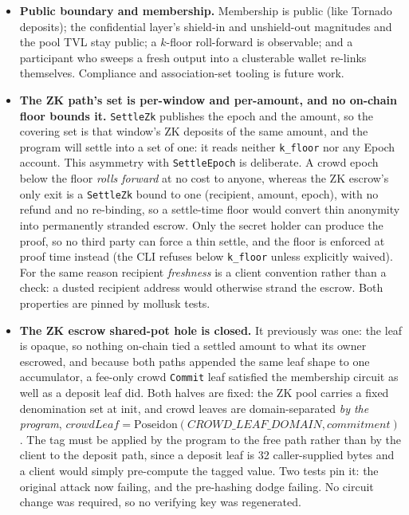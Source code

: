 \documentclass[10pt]{article}
\newcommand{\code}[1]{\texttt{#1}}
\begin{document}
\begin{itemize}[leftmargin=1.4em,itemsep=0.15em]
        path makes a cross-epoch claim, and mitigations are roadmap items.
  \item \textbf{Public boundary and membership.} Membership is public (like
        Tornado deposits); the confidential layer's shield-in and unshield-out
        magnitudes and the pool TVL stay public; a $k$-floor roll-forward is
        observable; and a participant who sweeps a fresh output into a clusterable
        wallet re-links themselves. Compliance and association-set tooling is
        future work.
  \item \textbf{The ZK path's set is per-window and per-amount, and no on-chain
        floor bounds it.} \code{SettleZk} publishes the epoch and the amount, so
        the covering set is that window's ZK deposits of the same amount, and the
        program will settle into a set of one: it reads neither \code{k\_floor}
        nor any Epoch account. This asymmetry with \code{SettleEpoch} is
        deliberate. A crowd epoch below the floor \emph{rolls forward} at no cost
        to anyone, whereas the ZK escrow's only exit is a \code{SettleZk} bound to
        one (recipient, amount, epoch), with no refund and no re-binding, so a
        settle-time floor would convert thin anonymity into permanently stranded
        escrow. Only the secret holder can produce the proof, so no third party
        can force a thin settle, and the floor is enforced at proof time instead
        (the CLI refuses below \code{k\_floor} unless explicitly waived). For the
        same reason recipient \emph{freshness} is a client convention rather than
        a check: a dusted recipient address would otherwise strand the escrow.
        Both properties are pinned by mollusk tests.
  \item \textbf{The ZK escrow shared-pot hole is closed.} It previously was one:
        the leaf is opaque, so nothing on-chain tied a settled amount to what its
        owner escrowed, and because both paths appended the same leaf shape to one
        accumulator, a fee-only crowd \code{Commit} leaf satisfied the membership
        circuit as well as a deposit leaf did. Both halves are fixed: the ZK pool
        carries a fixed denomination set at init, and crowd leaves are
        domain-separated \emph{by the program},
        $\mathit{crowdLeaf} = \mathrm{Poseidon}(\mathit{CROWD\_LEAF\_DOMAIN},
        \mathit{commitment})$. The tag must be applied by the program to the free
        path rather than by the client to the deposit path, since a deposit leaf is
        32 caller-supplied bytes and a client would simply pre-compute the tagged
        value. Two tests pin it: the original attack now failing, and the
        pre-hashing dodge failing. No circuit change was required, so no verifying
        key was regenerated.
\end{itemize}
\end{document}
